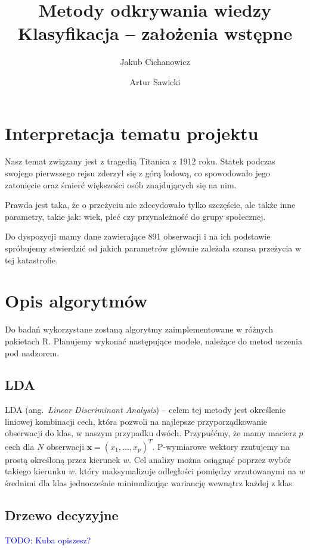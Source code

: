 \documentclass{article}
\newcommand{\TODO}[1]{\textcolor{blue}{TODO: #1}}
\newcommand{\ang}[1]{ang.~{\itshape #1}}
\begin{document}
\title{Metody odkrywania wiedzy \\%
{\large Klasyfikacja -- założenia wstępne} }

\author{Jakub Cichanowicz \and Artur Sawicki}

\maketitle

\section{Interpretacja tematu projektu}
Nasz temat związany jest z tragedią Titanica z 1912 roku. Statek podczas swojego pierwszego rejsu zderzył się z górą lodową, co spowodowało jego zatonięcie oraz śmierć większości osób znajdujących się na nim.

Prawda jest taka, że o przeżyciu nie zdecydowało tylko szczęście, ale także inne parametry, takie jak: wiek, płeć czy przynależność do grupy społecznej.

Do dyspozycji mamy dane zawierające 891 obserwacji i na ich podstawie spróbujemy stwierdzić od jakich parametrów głównie zależała szansa przeżycia w tej katastrofie.

\section{Opis algorytmów}
Do badań wykorzystane zostaną algorytmy zaimplementowane w różnych pakietach R. Planujemy wykonać następujące modele, należące do metod uczenia pod nadzorem.

\subsection{LDA}
LDA (\ang{Linear Discriminant Analysis}) -- celem tej metody jest określenie liniowej kombinacji cech, która pozwoli na najlepsze przyporządkowanie obserwacji do klas, w naszym przypadku dwóch. Przypuśćmy, że mamy macierz $p$ cech dla $N$ obserwacji $\mathbf{x}=(x_{1},...,x_{p})^{T}$. P-wymiarowe wektory rzutujemy na prostą określoną przez kierunek $w$. Cel analizy można osiągnąć poprzez wybór takiego kierunku $w$, który maksymalizuje odległości pomiędzy zrzutowanymi na $w$ średnimi dla klas jednocześnie minimalizując wariancję wewnątrz każdej z klas.

\subsection{Drzewo decyzyjne}
\TODO{Kuba opiszesz?}
\end{document}
